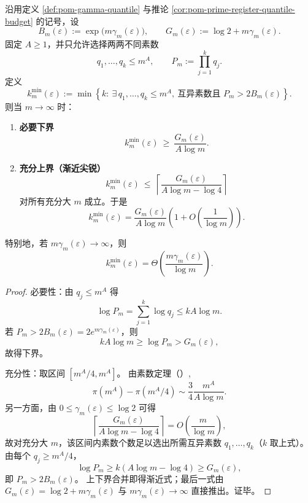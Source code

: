 \begin{theorem}[多项式模数上界下的素数轴数定标律]\label{thm:conclusion-prime-axis-count-scaling}
沿用定义 \ref{def:pom-gamma-quantile} 与推论 \ref{cor:pom-prime-register-quantile-budget} 的记号，设
\[
B_m(\varepsilon):=\exp\!\bigl(m\gamma_m(\varepsilon)\bigr),\qquad
G_m(\varepsilon):=\log 2+m\gamma_m(\varepsilon).
\]
固定 \(A\ge 1\)，并只允许选择两两不同素数
\[
q_1,\dots,q_k\le m^A,\qquad
P_m:=\prod_{j=1}^{k}q_j.
\]
定义
\[
k_m^{\min}(\varepsilon):=
\min\left\{
k:\ \exists\,q_1,\dots,q_k\le m^A,\ \text{互异素数且 }P_m>2B_m(\varepsilon)
\right\}.
\]
则当 \(m\to\infty\) 时：
\begin{enumerate}
  \item \textbf{必要下界}
  \[
  k_m^{\min}(\varepsilon)\ \ge\
  \frac{G_m(\varepsilon)}{A\log m}.
  \]
  \item \textbf{充分上界（渐近尖锐）}
  \[
  k_m^{\min}(\varepsilon)\ \le\
  \left\lceil\frac{G_m(\varepsilon)}{A\log m-\log 4}\right\rceil
  \]
  对所有充分大 \(m\) 成立。于是
  \[
  k_m^{\min}(\varepsilon)
  =
  \frac{G_m(\varepsilon)}{A\log m}
  \left(1+O\!\left(\frac{1}{\log m}\right)\right).
  \]
\end{enumerate}
特别地，若 \(m\gamma_m(\varepsilon)\to\infty\)，则
\[
k_m^{\min}(\varepsilon)=\Theta\!\left(\frac{m\gamma_m(\varepsilon)}{\log m}\right).
\]
\end{theorem}
\begin{proof}
必要性：由 \(q_j\le m^A\) 得
\[
\log P_m=\sum_{j=1}^k\log q_j\le kA\log m.
\]
若 \(P_m>2B_m(\varepsilon)=2e^{m\gamma_m(\varepsilon)}\)，则
\[
kA\log m\ge \log P_m>G_m(\varepsilon),
\]
故得下界。
\par
充分性：取区间 \([m^A/4,m^A]\)。
由素数定理（\cite{Apostol1976}）,
\[
\pi(m^A)-\pi(m^A/4)
\sim \frac{3}{4}\frac{m^A}{A\log m}.
\]
另一方面，由 \(0\le\gamma_m(\varepsilon)\le \log 2\) 可得
\[
\left\lceil\frac{G_m(\varepsilon)}{A\log m-\log 4}\right\rceil
=O\!\left(\frac{m}{\log m}\right),
\]
故对充分大 \(m\)，该区间内素数个数足以选出所需互异素数 \(q_1,\dots,q_k\)（\(k\) 取上式）。
由每个 \(q_j\ge m^A/4\)，
\[
\log P_m\ge k(A\log m-\log 4)\ge G_m(\varepsilon),
\]
即 \(P_m>2B_m(\varepsilon)\)。
上下界合并即得渐近式；最后一式由 \(G_m(\varepsilon)=\log2+m\gamma_m(\varepsilon)\) 与 \(m\gamma_m(\varepsilon)\to\infty\) 直接推出。证毕。
\end{proof}

